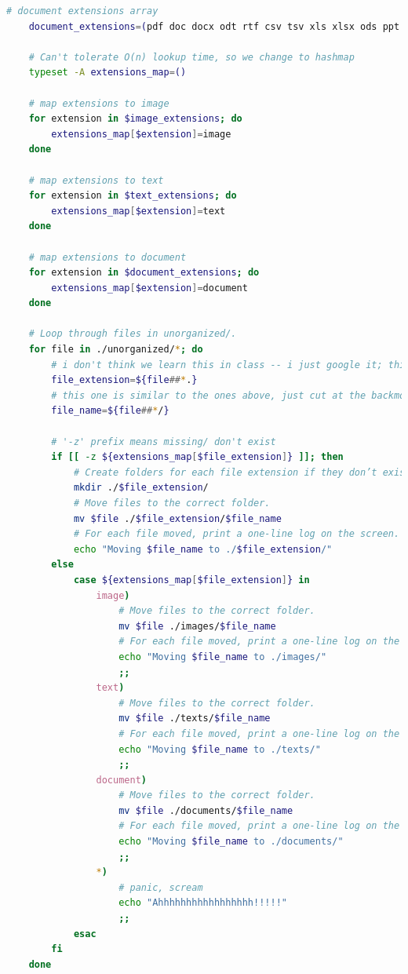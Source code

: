 \documentclass{article}
\theoremstyle{remark}
\begin{document}
\begin{enumerate}
\begin{lstlisting}[language=bash, caption={organize.sh}]
    # document extensions array
    document_extensions=(pdf doc docx odt rtf csv tsv xls xlsx ods ppt pptx odp)

    # Can't tolerate O(n) lookup time, so we change to hashmap
    typeset -A extensions_map=()

    # map extensions to image
    for extension in $image_extensions; do
        extensions_map[$extension]=image
    done 

    # map extensions to text
    for extension in $text_extensions; do
        extensions_map[$extension]=text
    done 

    # map extensions to document
    for extension in $document_extensions; do
        extensions_map[$extension]=document
    done 

    # Loop through files in unorganized/.
    for file in ./unorganized/*; do
        # i don't think we learn this in class -- i just google it; this should keep only string after `.`
        file_extension=${file##*.}
        # this one is similar to the ones above, just cut at the backmost `/` in file directory
        file_name=${file##*/}

        # '-z' prefix means missing/ don't exist
        if [[ -z ${extensions_map[$file_extension]} ]]; then
            # Create folders for each file extension if they don’t exist.
            mkdir ./$file_extension/
            # Move files to the correct folder.
            mv $file ./$file_extension/$file_name
            # For each file moved, print a one-line log on the screen. The log should look like the following: "Moving <filename> to <foldername>/"
            echo "Moving $file_name to ./$file_extension/"
        else
            case ${extensions_map[$file_extension]} in
                image)
                    # Move files to the correct folder.
                    mv $file ./images/$file_name
                    # For each file moved, print a one-line log on the screen. The log should look like the following: "Moving <filename> to <foldername>/"
                    echo "Moving $file_name to ./images/"
                    ;;
                text)
                    # Move files to the correct folder.
                    mv $file ./texts/$file_name
                    # For each file moved, print a one-line log on the screen. The log should look like the following: "Moving <filename> to <foldername>/"
                    echo "Moving $file_name to ./texts/"
                    ;;
                document)
                    # Move files to the correct folder.
                    mv $file ./documents/$file_name
                    # For each file moved, print a one-line log on the screen. The log should look like the following: "Moving <filename> to <foldername>/"
                    echo "Moving $file_name to ./documents/"
                    ;;
                *)
                    # panic, scream
                    echo "Ahhhhhhhhhhhhhhhhh!!!!!"
                    ;;
            esac
        fi
    done    
    \end{lstlisting}



\end{enumerate}
\end{document}
